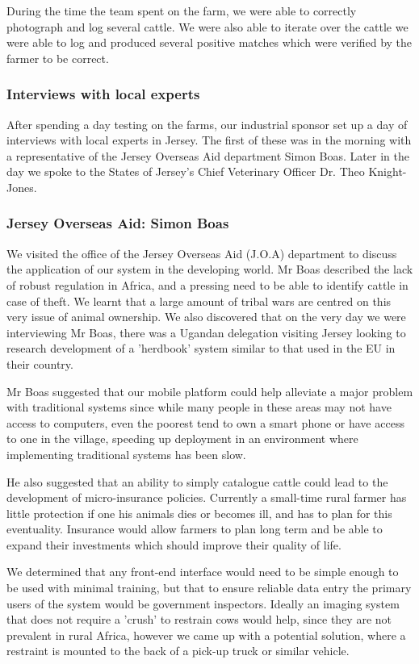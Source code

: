 During the time the team spent on the farm, we were able to correctly photograph and log several cattle. We were also able to iterate over the cattle we were able to log and produced several positive matches which were verified by the farmer to be correct.

\subsubsection{Interviews with local experts}
After spending a day testing on the farms, our industrial sponsor set up a day of interviews with local experts in Jersey. The first of these was in the morning with a representative of the Jersey Overseas Aid department Simon Boas. Later in the day we spoke to the States of Jersey's Chief Veterinary Officer Dr. Theo Knight-Jones.

\subsubsection{Jersey Overseas Aid: Simon Boas}

We visited the office of the Jersey Overseas Aid (J.O.A) department to discuss the application of our system in the developing world. Mr Boas described the lack of robust regulation in Africa, and a pressing need to be able to identify cattle in case of theft. We learnt that a large amount of tribal wars are centred on this very issue of animal ownership. We also discovered that on the very day we were interviewing Mr Boas, there was a Ugandan delegation visiting Jersey looking to research development of a 'herdbook' system similar to that used in the EU in their country. 

Mr Boas suggested that our mobile platform could help alleviate a major problem with traditional systems since while many people in these areas may not have access to computers, even the poorest tend to own a smart phone or have access to one in the village, speeding up deployment in an environment where implementing traditional systems has been slow. 

He also suggested that an ability to simply catalogue cattle could lead to the development of micro-insurance policies. Currently a small-time rural farmer has little protection if one his animals dies or becomes ill, and has to plan for this eventuality. Insurance would allow farmers to plan long term and be able to expand their investments which should improve their quality of life.

We determined that any front-end interface would need to be simple enough to be used with minimal training, but that to ensure reliable data entry the primary users of the system would be government inspectors. Ideally an imaging system that does not require a 'crush' to restrain cows would help, since they are not prevalent in rural Africa, however we came up with a potential solution, where a restraint is mounted to the back of a pick-up truck or similar vehicle. 

